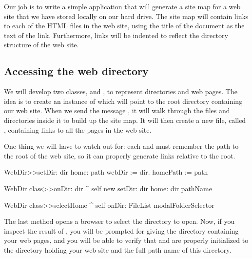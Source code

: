 \documentclass[a4paper,10pt,twoside]{book}
\begin{document}

Our job is to write a simple application that will generate a site map for a web site that we have stored locally on our hard drive.  The site map will contain links to each of the HTML files in the web site, using the title of the document as the text of the link. Furthermore, links will be indented to reflect the directory structure of the web site.

\subsection{Accessing the web directory}


We will develop two classes,  and , to represent directories and web pages.  The idea is to create an instance of  which will point to the root directory containing our web site.  When we send the message , it will walk through the files and directories inside it to build up the site map.  It will then create a new file, called , containing links to all the pages in the web site.

One thing we will have to watch out for: each  and  must remember the path to the root of the web site, so it can properly generate links relative to the root.


\begin{code}{}
WebDir>>setDir: dir home: path 
	webDir := dir.
	homePath := path

WebDir class>>onDir: dir
	^ self new setDir: dir home: dir pathName

WebDir class>>selectHome
	^ self onDir: FileList modalFolderSelector
\end{code}

The last method opens a browser to select the directory to open.
Now, if you inspect the result of , you will be prompted for giving the directory containing your web pages, and you will be able to verify that  and  are properly initialized to the directory holding your web site and the full path name of this directory.
\end{document}
